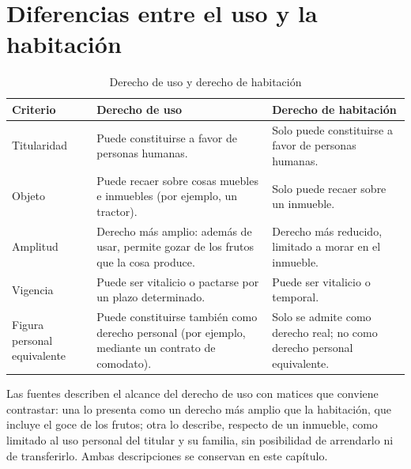 \documentclass[12pt,oneside]{book}
\begin{document}
\section{Diferencias entre el uso y la habitación}
\label{sec:usohab}

\begin{table}[H]
\centering
\caption{Derecho de uso y derecho de habitación}
\small
\renewcommand{\arraystretch}{1.2}
\begin{tabularx}{\textwidth}{>{\raggedright\arraybackslash}p{}>{\raggedright\arraybackslash}X>{\raggedright\arraybackslash}X}
\toprule
\textbf{Criterio} & \textbf{Derecho de uso} & \textbf{Derecho de habitación} \\
\midrule
Titularidad & Puede constituirse a favor de personas humanas. & Solo puede constituirse a favor de personas humanas. \\
Objeto & Puede recaer sobre cosas muebles e inmuebles (por ejemplo, un tractor). & Solo puede recaer sobre un inmueble. \\
Amplitud & Derecho más amplio: además de usar, permite gozar de los frutos que la cosa produce. & Derecho más reducido, limitado a morar en el inmueble. \\
Vigencia & Puede ser vitalicio o pactarse por un plazo determinado. & Puede ser vitalicio o temporal. \\
Figura personal equivalente & Puede constituirse también como derecho personal (por ejemplo, mediante un contrato de comodato). & Solo se admite como derecho real; no como derecho personal equivalente. \\
\bottomrule
\end{tabularx}
\end{table}

\begin{note}
Las fuentes describen el alcance del derecho de uso con matices que conviene contrastar: una lo presenta como un derecho más amplio que la habitación, que incluye el goce de los frutos; otra lo describe, respecto de un inmueble, como limitado al uso personal del titular y su familia, sin posibilidad de arrendarlo ni de transferirlo. Ambas descripciones se conservan en este capítulo.
\end{note}
\end{document}
